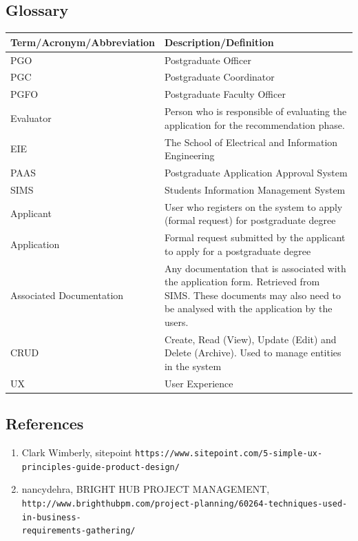 \documentclass{article}
\begin{document}
\subsection{Glossary}
\begin{tabu} to \textwidth {| X[l] | X[l] |}
\hline
\textbf{Term/Acronym/Abbreviation} & \textbf{Description/Definition} \\
\hline
PGO & Postgraduate Officer \\
\hline
PGC & Postgraduate Coordinator \\
\hline
PGFO & Postgraduate Faculty Officer \\
\hline
Evaluator & Person who is responsible of evaluating the application for the recommendation phase. \\
\hline
EIE & The School of Electrical and Information Engineering \\
\hline
PAAS & Postgraduate Application Approval System \\
\hline
SIMS & Students Information Management System \\
\hline
Applicant & User who registers on the system to apply (formal request) for postgraduate degree \\
\hline
Application & Formal request submitted by the applicant to apply for a postgraduate degree \\
\hline
Associated Documentation & Any documentation that is associated with the application form. Retrieved from SIMS. These documents may also need to be analysed with the application by the users. \\
\hline
CRUD & Create, Read (View), Update (Edit) and Delete (Archive). Used to manage entities in the system \\
\hline
UX & User Experience \\
\hline
\end{tabu}

\subsection{References}
\begin{enumerate}
\item Clark Wimberly, sitepoint \newline
\texttt{https://www.sitepoint.com/5-simple-ux-principles-guide-product-design/}
\item nancydehra, BRIGHT HUB PROJECT MANAGEMENT, \newline
\texttt{http://www.brighthubpm.com/project-planning/60264-techniques-used-in-business- \\ requirements-gathering/}
\end{enumerate}
\end{document}

